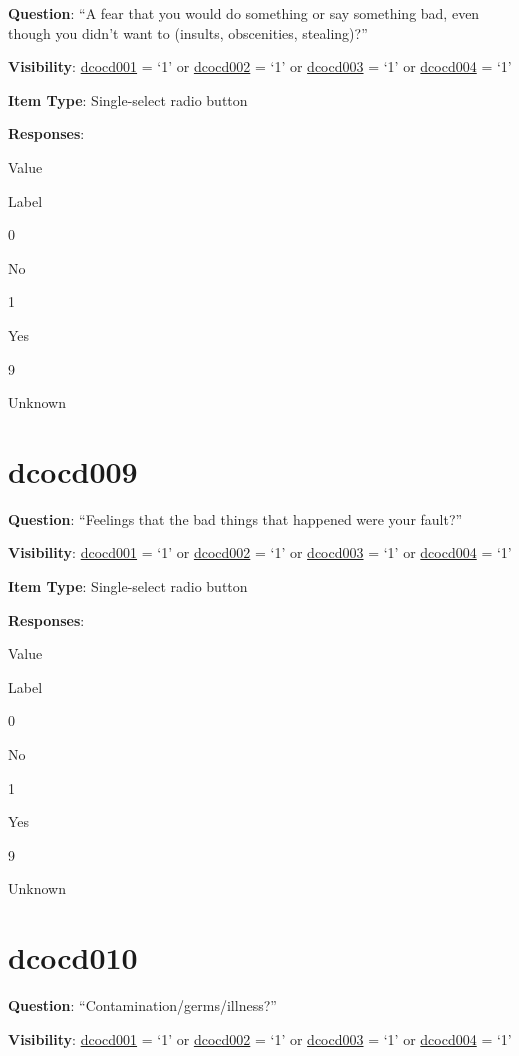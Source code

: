 \documentclass[]{book}
\begin{document}
\textbf{Question}: ``A fear that you would do something or say something bad, even though you didn't want to (insults, obscenities, stealing)?''

\textbf{Visibility}: \protect\hyperlink{dcocd001}{dcocd001} = `1' or \protect\hyperlink{dcocd002}{dcocd002} = `1' or \protect\hyperlink{dcocd003}{dcocd003} = `1' or \protect\hyperlink{dcocd004}{dcocd004} = `1'

\textbf{Item Type}: Single-select radio button

\textbf{Responses}:

Value

Label

0

No

1

Yes

9

Unknown

\hypertarget{dcocd009}{%
\section{dcocd009}\label{dcocd009}}

\textbf{Question}: ``Feelings that the bad things that happened were your fault?''

\textbf{Visibility}: \protect\hyperlink{dcocd001}{dcocd001} = `1' or \protect\hyperlink{dcocd002}{dcocd002} = `1' or \protect\hyperlink{dcocd003}{dcocd003} = `1' or \protect\hyperlink{dcocd004}{dcocd004} = `1'

\textbf{Item Type}: Single-select radio button

\textbf{Responses}:

Value

Label

0

No

1

Yes

9

Unknown

\hypertarget{dcocd010}{%
\section{dcocd010}\label{dcocd010}}

\textbf{Question}: ``Contamination/germs/illness?''

\textbf{Visibility}: \protect\hyperlink{dcocd001}{dcocd001} = `1' or \protect\hyperlink{dcocd002}{dcocd002} = `1' or \protect\hyperlink{dcocd003}{dcocd003} = `1' or \protect\hyperlink{dcocd004}{dcocd004} = `1'
\end{document}
